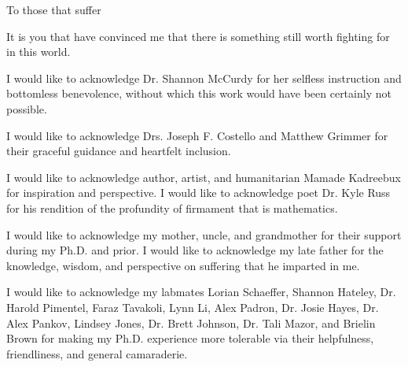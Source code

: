 \documentclass{ucbthesis}
\begin{document}


\maketitle
\approvalpage
\copyrightpage



\begin{frontmatter}

\begin{dedication}
\null\vfil
\begin{center}
To those that suffer\\\vspace{12pt}

It is you that have convinced me that there is something still worth
fighting for in this world.

\end{center}
\vfil\null
\end{dedication}


\tableofcontents
\clearpage
\listoffigures
\clearpage
\listoftables

\begin{acknowledgements}

I would like to acknowledge Dr. Shannon McCurdy for her 
selfless instruction and bottomless benevolence, without which this
work would have been certainly not possible.

I would like to acknowledge Drs. Joseph F. Costello and Matthew
Grimmer for their graceful guidance and heartfelt inclusion. 

I would like to acknowledge author, artist, and humanitarian Mamade
Kadreebux for inspiration and perspective. I would like to acknowledge
poet Dr. Kyle Russ for his rendition of the profundity of firmament
that is mathematics.

I would like to acknowledge my mother, uncle, and grandmother for
their support during my Ph.D. and prior. I would like to acknowledge
my late father for the knowledge, wisdom, and perspective on suffering
that he imparted in me. 
  
I would like to acknowledge my labmates Lorian
Schaeffer, Shannon Hateley, Dr. Harold Pimentel, Faraz Tavakoli, Lynn
Li, Alex Padron, Dr. Josie Hayes, Dr. Alex Pankov, Lindsey Jones,
Dr. Brett Johnson, Dr. Tali Mazor, and Brielin Brown for making my Ph.D. experience more
tolerable via their helpfulness, friendliness, and general
camaraderie.


\end{acknowledgements}
\end{frontmatter}
\end{document}
